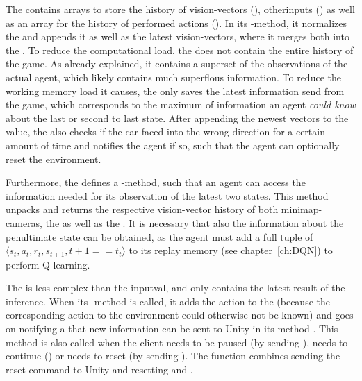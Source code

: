 The  contains arrays to store the history of vision-vectors (), otherinputs () as well as an array for the history of performed actions (). In its -method, it normalizes the  and appends it as well as the latest vision-vectors, where it merges both into the .
To reduce the computational load, the  does not contain the entire history of the game. As already explained, it contains a superset of the observations of the actual agent, which likely contains much superflous information. To reduce the working memory load it causes, the  only saves the latest information send from the game, which corresponds to the maximum of information an agent \textit{could know} about the last or second to last state. After appending the newest vectors to the value, the  also checks if the car faced into the wrong direction for a certain amount of time and notifies the agent if so, such that the agent can optionally reset the environment.

Furthermore, the  defines a -method, such that an agent can access the information needed for its observation of the latest two states. This method unpacks and returns the respective vision-vector history of both minimap-cameras, the  as well as the . It is necessary that also the information about the penultimate state can be obtained, as the agent must add a full tuple of $\langle s_t, a_t, r_t, s_{t+1}, t+1==t_t \rangle$ to its replay memory (see chapter~\ref{ch:DQN}) to perform Q-learning. 

The  is less complex than the inputval, and only contains the latest result of the inference. When its -method is called, it adds the action to the  (because the corresponding action to the environment could otherwise not be known) and goes on notifying a  that new information can be sent to Unity in its method . This method is also called when the client needs to be paused (by sending ), needs to continue () or needs to reset (by sending ). The function  combines sending the reset-command to Unity and resetting  and .

